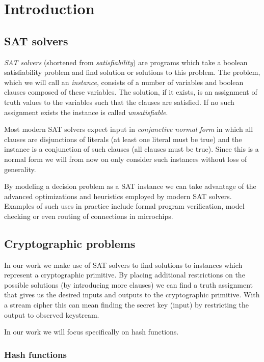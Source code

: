 \section{Introduction}

\subsection{SAT solvers}
\emph{SAT solvers} (shortened from \emph{satisfiability}) are programs which take a boolean satisfiability problem and find solution or solutions to this problem.
The problem, which we will call an \emph{instance}, consists of a number of variables and boolean clauses composed of these variables.
The solution, if it exists, is an assignment of truth values to the variables such that the clauses are satisfied.
If no such assignment exists the instance is called \emph{unsatisfiable}.

Most modern SAT solvers expect input in \emph{conjunctive normal form} in which all clauses are disjunctions of literals (at least one literal must be true) and the instance is a conjunction of such clauses (all clauses must be true).
Since this is a normal form we will from now on only consider such instances without loss of generality.

By modeling a decision problem as a SAT instance we can take advantage of the advanced optimizations and heuristics employed by modern SAT solvers.
Examples of such uses in practice include formal program verification, model checking or even routing of connections in microchips.

\subsection{Cryptographic problems}
In our work we make use of SAT solvers to find solutions to instances which represent a cryptographic primitive.
By placing additional restrictions on the possible solutions (by introducing more clauses) we can find a truth assignment that gives us the desired inputs and outputs to the cryptographic primitive.
With a stream cipher this can mean finding the secret key (input) by restricting the output to observed keystream.

In our work we will focus specifically on hash functions.

\subsubsection{Hash functions}

